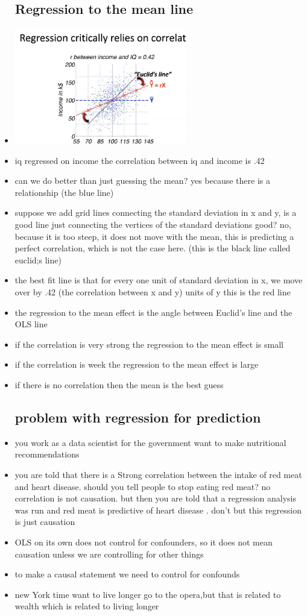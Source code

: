 \documentclass{article}
\begin{document}
\begin{itemize}
\subsection{Regression to the mean line }
\item \includegraphics[width=7.5cm]{Final_Review/lecture_9/regresson_to_man_effect.jpg}
\item iq regressed on income
\itme the correlation between iq and income is .42
\item can we do better than just guessing the mean? yes because there is a relationship (the blue line)
\item suppose we add grid lines connecting the standard deviation in x and y, is a good line just connecting the vertices of the standard deviations good? no, because it is too steep, it does not move with the mean, this is predicting a perfect correlation, which is not the case here.  (this is the black line called euclid;s line)
\item the best fit line is that for every one unit of standard deviation in x, we move over by .42 (the correlation between x and y) units of y this is the red line 
\item the regression to the mean effect is the angle between Euclid's line and the OLS line 
\item if the correlation is very strong the regression to the mean effect is small 
\item if the correlation is week the regression to the mean effect is large 
\item if there is no correlation then the mean is the best guess 
\subsection{problem with regression for prediction}
\item you work as a data scientist for the government  want to make nutritional recommendations 
\item you are told that there is a Strong correlation between the intake of red meat and heart disease. should you tell people to stop eating red meat? no correlation is not causation. but then you are told that a regression analysis was run and red meat is predictive of heart disease . don't but this regression is just causation 
\item OLS on its own does not control for confounders, so it does not mean causation unless we are controlling for other things 
\item to make a causal statement we need to control for confounds
\item new York time want to live longer go to the opera,but that is related to wealth which is related to living longer

\end{itemize}
\end{document}
